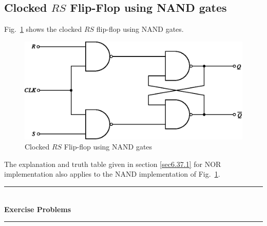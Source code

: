 \newpage

\subsection{Clocked $RS$ Flip-Flop using NAND gates}\label{sec6.37.2}

Fig.~\ref{fig6.44} shows the clocked $RS$ flip-flop using NAND gates.
\begin{figure}[H]
\centering
\includegraphics{chap6/fig142.eps}
\caption{Clocked $RS$ Flip-flop using NAND gates}\label{fig6.44}
\end{figure}

The explanation and truth table given in section \ref{sec6.37.1} for NOR implementation also applies to the NAND implementation of Fig.~\ref{fig6.44}.

\smallskip
\begin{center}
\rule{5cm}{1pt}\\[-2pt]
{\bf Exercise Problems}\\[-4pt]
\rule{5cm}{1pt}
\end{center}

